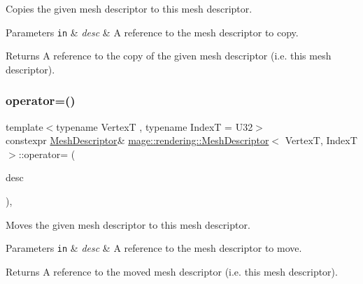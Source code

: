 Copies the given mesh descriptor to this mesh descriptor.


\begin{DoxyParams}[1]{Parameters}
\mbox{\tt in}  & {\em desc} & A reference to the mesh descriptor to copy. \\
\hline
\end{DoxyParams}
\begin{DoxyReturn}{Returns}
A reference to the copy of the given mesh descriptor (i.\+e. this mesh descriptor). 
\end{DoxyReturn}
\hypertarget{classmage_1_1rendering_1_1_mesh_descriptor_a044577019dcdb37ed0d1d919d9d33887}{}\label{classmage_1_1rendering_1_1_mesh_descriptor_a044577019dcdb37ed0d1d919d9d33887} 
\subsubsection{\texorpdfstring{operator=()}{operator=()}\hspace{0.1cm}{\footnotesize\ttfamily [2/2]}}
{\footnotesize\ttfamily template$<$typename VertexT , typename IndexT  = U32$>$ \\
constexpr \hyperlink{classmage_1_1rendering_1_1_mesh_descriptor}{Mesh\+Descriptor}\& \hyperlink{classmage_1_1rendering_1_1_mesh_descriptor}{mage\+::rendering\+::\+Mesh\+Descriptor}$<$ VertexT, IndexT $>$\+::operator= (\begin{DoxyParamCaption}\item[{\hyperlink{classmage_1_1rendering_1_1_mesh_descriptor}{Mesh\+Descriptor}$<$ VertexT, IndexT $>$ \&\&}]{desc }\end{DoxyParamCaption})\hspace{0.3cm}{\ttfamily [default]}, {\ttfamily [noexcept]}}

Moves the given mesh descriptor to this mesh descriptor.


\begin{DoxyParams}[1]{Parameters}
\mbox{\tt in}  & {\em desc} & A reference to the mesh descriptor to move. \\
\hline
\end{DoxyParams}
\begin{DoxyReturn}{Returns}
A reference to the moved mesh descriptor (i.\+e. this mesh descriptor). 
\end{DoxyReturn}


